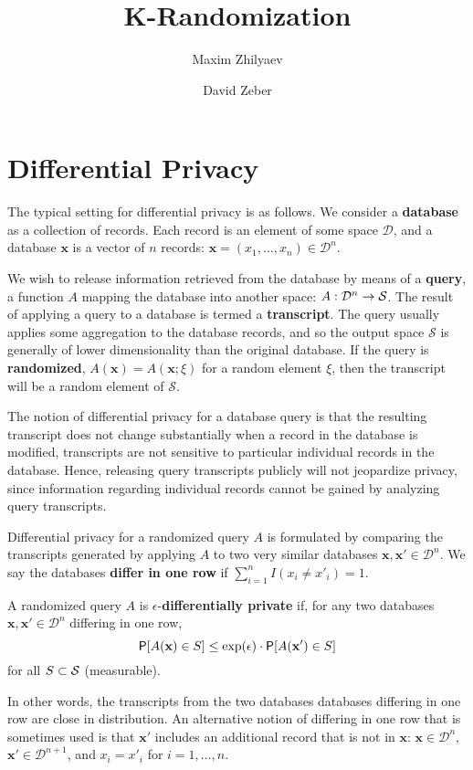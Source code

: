 \documentclass[11pt,draft]{article}
\title{K-Randomization}
\author{Maxim Zhilyaev \and David Zeber}
\newcommand{\Dsp}{\mathcal{D}}
\newcommand{\Ssp}{\mathcal{S}}
\newcommand{\xv}{\mathbf{x}}
\begin{document}
\maketitle

\section{Differential Privacy}
\label{sec:dp}

The typical setting for differential privacy is as follows. 
We consider a \textbf{database} as a collection of records. 
Each record is an element of some space $\Dsp$, and a database $\xv$ is a vector of $n$ records: $\xv = (x_1,\dots,x_n) \in \Dsp^n$.

We wish to release information retrieved from the database by means of a \textbf{query}, a function $A$ mapping the database into another space: $\map{A}{\Dsp^n}{\Ssp}$. The result of applying a query to a database is termed a \textbf{transcript}.
The query usually applies some aggregation to the database records, and so the output space $\Ssp$ is generally of lower dimensionality than the original database.
If the query is \textbf{randomized}, \ie $A(\xv) = A(\xv; \xi)$ for a random element $\xi$, then the transcript will be a random element of $\Ssp$.

The notion of differential privacy for a database query is that the resulting transcript does not change substantially when a record in the database is modified,
\ie transcripts are not sensitive to particular individual records in the database.
Hence, releasing query transcripts publicly will not jeopardize privacy, since information regarding individual records cannot be gained by analyzing query transcripts.


Differential privacy for a randomized query $A$ is formulated by comparing the transcripts generated by applying $A$ to two very similar databases $\xv,\xv' \in \Dsp^n$.
We say the databases \textbf{differ in one row} if 
$\sum_{i=1}^n I(x_i \neq x'_i) = 1$.
\begin{defn}
A randomized query $A$ is $\epsilon$-\textbf{differentially private} if, 
for any two databases $\xv,\xv' \in \Dsp^n$ differing in one row,
\begin{equation}\label{eq:dpdef}
\P[A(\xv) \in S] \leq \exp(\epsilon) \cdot \P[A(\xv') \in S]
\end{equation}
for all $S \cont \Ssp$ (measurable).
\end{defn}
In other words, the transcripts from the two databases databases differing in one row are close in distribution.
An alternative notion of differing in one row that is sometimes used is that $\xv'$ includes an additional record that is not in $\xv$:
$\xv\in \Dsp^n$, $\xv' \in \Dsp^{n+1}$, and $x_i = x'_i$ for $i = 1,\dots,n$.
\end{document}

